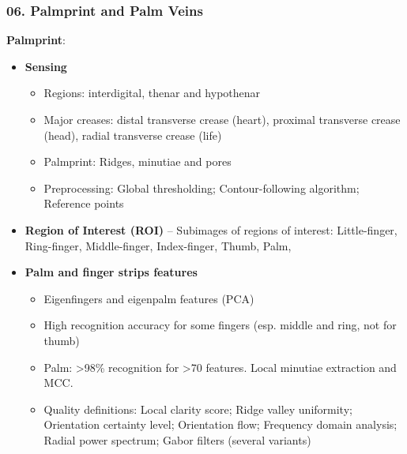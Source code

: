 \documentclass[a4paper]{article}
\begin{document}
    \subsubsection*{06. Palmprint and Palm Veins}
      \textbf{Palmprint}:
      \begin{itemize}
        \item \textbf{Sensing}
        \begin{itemize}
          \item Regions: interdigital, thenar and hypothenar
          \item Major creases: distal transverse crease (heart), proximal transverse crease (head), radial transverse crease (life)
          \item Palmprint: Ridges, minutiae and pores
          \item Preprocessing: Global thresholding; Contour-following algorithm; Reference points
        \end{itemize}
        \item \textbf{Region of Interest (ROI)} -- Subimages of regions of interest:  Little-finger, Ring-finger, Middle-finger, Index-finger, Thumb, Palm,
        \item \textbf{Palm and finger strips features}
        \begin{itemize}
          \item Eigenfingers and eigenpalm features (PCA)
          \item High recognition accuracy for some fingers (esp. middle and ring, not for thumb)
          \item Palm: >98\% recognition for >70 features. Local minutiae extraction and MCC.
          \item Quality definitions:
          Local clarity score; Ridge valley uniformity; Orientation certainty level; Orientation flow; Frequency domain analysis; Radial power spectrum; Gabor filters (several variants)
        \end{itemize}
      \end{itemize}
\end{document}
